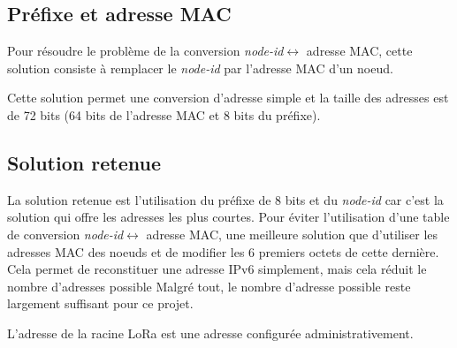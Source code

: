 \subsection*{Préfixe et adresse MAC}
    Pour résoudre le problème de la conversion \textit{node-id}$\leftrightarrow	$ adresse MAC, cette solution consiste à remplacer le \textit{node-id} par l'adresse MAC d'un noeud.

    Cette solution permet une conversion d'adresse simple et la taille des adresses est de 72 bits (64 bits de l'adresse MAC et 8 bits du préfixe).

\subsection*{Solution retenue}
    La solution retenue est l'utilisation du préfixe de 8 bits et du \textit{node-id} car c'est la solution qui offre les adresses les plus courtes. Pour éviter l'utilisation d'une table de conversion \textit{node-id}$\leftrightarrow$ adresse MAC, une meilleure solution que d'utiliser les adresses MAC des noeuds et de modifier les 6 premiers octets de cette dernière. Cela permet de reconstituer une adresse IPv6 simplement, mais cela réduit le nombre d'adresses possible
    Malgré tout, le nombre d'adresse possible reste largement suffisant pour ce projet.

    L'adresse de la racine LoRa est une adresse configurée administrativement.

